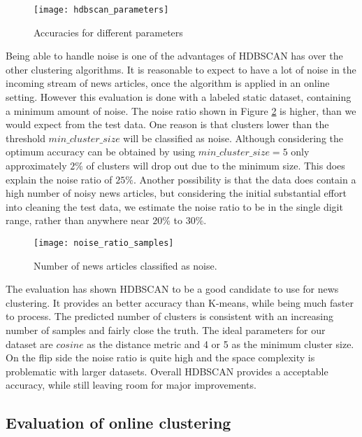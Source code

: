 \begin{figure}[h]
    \centering
    \texttt{[image: hdbscan\_parameters]}
    \caption{Accuracies for different parameters}
    \label{fig:hdbscan_parameters}
\end{figure}


Being able to handle noise is one of the advantages of HDBSCAN has over the other clustering algorithms. It is reasonable to expect to have a lot of noise in the incoming stream of news articles, once the algorithm is applied in an online setting. However this evaluation is done with a labeled static dataset, containing a minimum amount of noise. The noise ratio shown in Figure \ref{fig:noise_ratio_samples} is higher, than we would expect from the test data. One reason is that clusters lower than the threshold $min\_cluster\_size$ will be classified as noise. Although considering the optimum accuracy can be obtained by using $min\_cluster\_size=5$ only approximately $2\%$ of clusters will drop out due to the minimum size. This does explain the noise ratio of $25\%$. Another possibility is that the data does contain a high number of noisy news articles, but considering the initial substantial effort into cleaning the test data, we estimate the noise ratio to be in the single digit range, rather than anywhere near $20\%$ to $30\%$. 


\begin{figure}[h]
    \centering
    \texttt{[image: noise\_ratio\_samples]}
    \caption{Number of news articles classified as noise.}
    \label{fig:noise_ratio_samples}
\end{figure}


The evaluation has shown HDBSCAN to be a good candidate to use for news clustering. It provides an better accuracy than K-means, while being much faster to process. The predicted number of clusters is consistent with an increasing number of samples and fairly close the truth. The ideal parameters for our dataset are $cosine$ as the distance metric and 4 or 5 as the minimum cluster size. On the flip side the noise ratio is quite high and the space complexity is problematic with larger datasets. Overall HDBSCAN provides a acceptable accuracy, while still leaving room for major improvements.

\subsection{Evaluation of online clustering}

